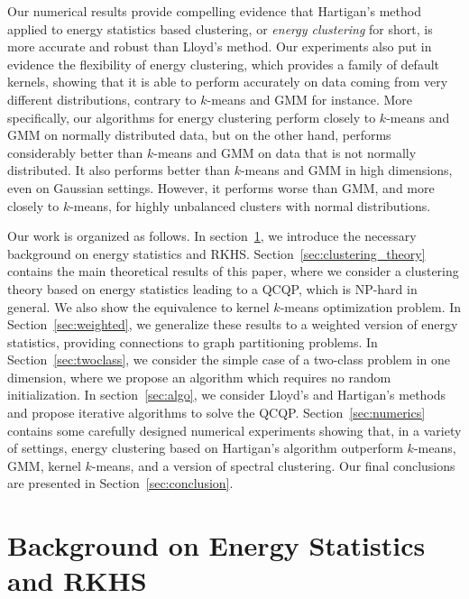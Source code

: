 \documentclass[aps,preprint,nofootinbib,floatfix]{revtex4-1}
\begin{document}
Our numerical results provide compelling evidence that 
Hartigan's method applied to energy statistics based clustering, 
or \emph{energy clustering} for short, is more accurate and robust than 
Lloyd's method. Our experiments also put in evidence the
flexibility of energy clustering, which provides a family of default kernels, 
showing that it is able to perform accurately on data coming from 
very different distributions, contrary to $k$-means and GMM for instance.
More specifically, our algorithms for energy clustering perform 
closely to $k$-means and GMM on normally distributed data, but on the other
hand, performs considerably better than $k$-means and GMM on  data that 
is not normally distributed. It also performs better than $k$-means 
and GMM in high dimensions, even on Gaussian settings. However, it performs 
worse than GMM, and more closely to $k$-means, for highly unbalanced clusters
with normal distributions.

Our work is organized as follows. In section~\ref{sec:background}, we introduce
the necessary background on energy statistics and RKHS.
Section~\ref{sec:clustering_theory} contains the main theoretical 
results of this paper,
where we consider a clustering theory based on energy statistics leading
to a QCQP, which is NP-hard in general. We also show the equivalence to 
kernel $k$-means optimization problem.
In Section~\ref{sec:weighted}, we generalize these results to a weighted
version of energy statistics, providing connections to graph
partitioning problems.
In Section~\ref{sec:twoclass}, we consider the  simple case of a two-class
problem in one dimension,
where we propose an algorithm which requires no random initialization.
In section~\ref{sec:algo}, we consider Lloyd's and Hartigan's methods
and propose iterative algorithms to solve the QCQP.
Section~\ref{sec:numerics} contains some carefully designed numerical
experiments showing that, in a variety of settings, energy clustering based
on Hartigan's algorithm
outperform $k$-means, GMM, kernel $k$-means, and a version of
spectral clustering.
Our final conclusions are presented in Section~\ref{sec:conclusion}.


\section{Background on Energy Statistics and RKHS}
\label{sec:background}

\end{document}
